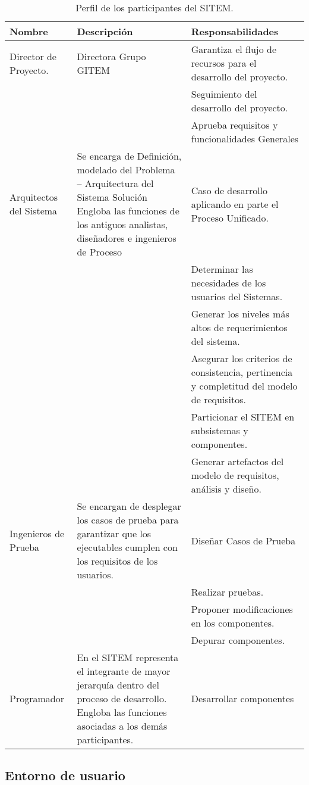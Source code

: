 \begin{table}
\begin{center}
\begin{tabular}{|p{4cm}|p{5cm}|p{5cm}|}
\hline
\textbf{Nombre} & \textbf{Descripción} & \textbf{Responsabilidades}\\
\hline
Director de Proyecto. & Directora Grupo GITEM & Garantiza el flujo de recursos para el desarrollo del proyecto.\\
&&Seguimiento del desarrollo del proyecto.\\
&&Aprueba requisitos y funcionalidades Generales\\
\hline
Arquitectos del Sistema & Se encarga de Definición, modelado del Problema – Arquitectura del Sistema Solución Engloba las funciones de los antiguos analistas, diseñadores e ingenieros de Proceso &Caso de desarrollo aplicando en parte el Proceso Unificado.\\
&&Determinar las necesidades de los usuarios del Sistemas.\\
&&Generar los niveles más altos de requerimientos del sistema.\\
&&Asegurar los criterios de consistencia, pertinencia y completitud del modelo de requisitos.\\
&&Particionar el SITEM en subsistemas y componentes.\\
&&Generar artefactos del modelo de requisitos, análisis y diseño.\\
\hline
Ingenieros de Prueba & Se encargan de desplegar los casos de prueba para garantizar que los ejecutables cumplen con los requisitos de los usuarios.& Diseñar Casos de Prueba\\
&&Realizar pruebas.\\
&&Proponer modificaciones en los componentes.\\
&&Depurar componentes.\\
\hline
Programador& En el SITEM representa el integrante de mayor jerarquía dentro del proceso de desarrollo. Engloba las funciones asociadas a los demás participantes. & Desarrollar componentes\\
\hline
\end{tabular}
\caption{Perfil de los participantes del SITEM.}
\label{participantes_sitem} 
\end{center}
\end{table}

\subsection{Entorno de usuario}

